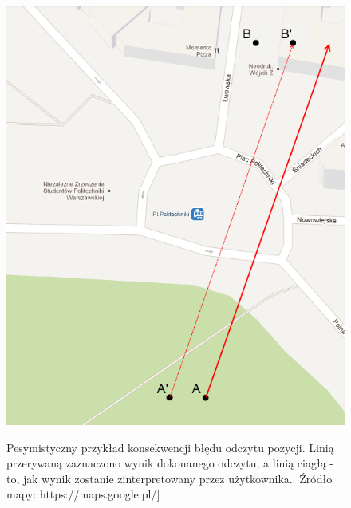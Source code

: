 \begin{figure}[!ht]
 \begin{center}
  \scalebox{0.55}
  {
   \includegraphics{figures/positionTracking.png}
  }
 \end{center}
 \caption{
  Pesymistyczny przykład konsekwencji błędu odczytu pozycji.
  Linią przerywaną zaznaczono wynik dokonanego odczytu, a linią ciagłą - to, jak wynik zostanie zinterpretowany przez użytkownika.
  [Źródło mapy: https://maps.google.pl/]
 }
 \label{fig:positionTracking}
\end{figure}
